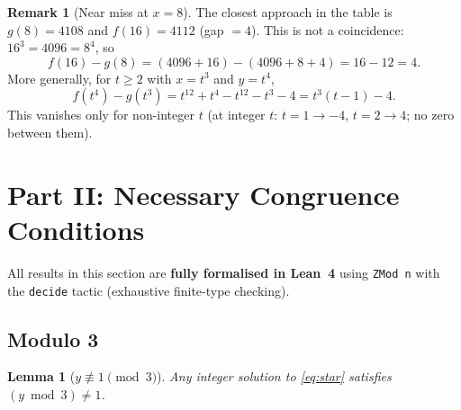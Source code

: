 \documentclass[12pt, a4paper]{article}
\newtheorem{lemma}[theorem]{Lemma}
\theoremstyle{definition}
\newtheorem{remark}[theorem]{Remark}
\begin{document}
\begin{remark}[Near miss at $x = 8$]\label{rem:nearmiss}
  The closest approach in the table is $g(8) = 4108$ and $f(16) = 4112$ (gap $= 4$).
  This is not a coincidence: $16^3 = 4096 = 8^4$, so
  \[
    f(16) - g(8) = (4096 + 16) - (4096 + 8 + 4) = 16 - 12 = 4.
  \]
  More generally, for $t \geq 2$ with $x = t^3$ and $y = t^4$,
  \[
    f(t^4) - g(t^3) = t^{12} + t^4 - t^{12} - t^3 - 4 = t^3(t - 1) - 4.
  \]
  This vanishes only for non-integer $t$  (at integer $t$: $t=1 \to -4$,
  $t=2 \to 4$; no zero between them).
\end{remark}

\section{Part II: Necessary Congruence Conditions}\label{sec:congruences}

All results in this section are \textbf{fully formalised in Lean~4} using
\texttt{ZMod n} with the \texttt{decide} tactic (exhaustive finite-type checking).

\subsection{Modulo 3}

\begin{lemma}[$y \not\equiv 1 \pmod{3}$]\label{lem:y_mod3}
  Any integer solution to \eqref{eq:star} satisfies $(y \bmod 3) \neq 1$.
\end{lemma}
\end{document}
